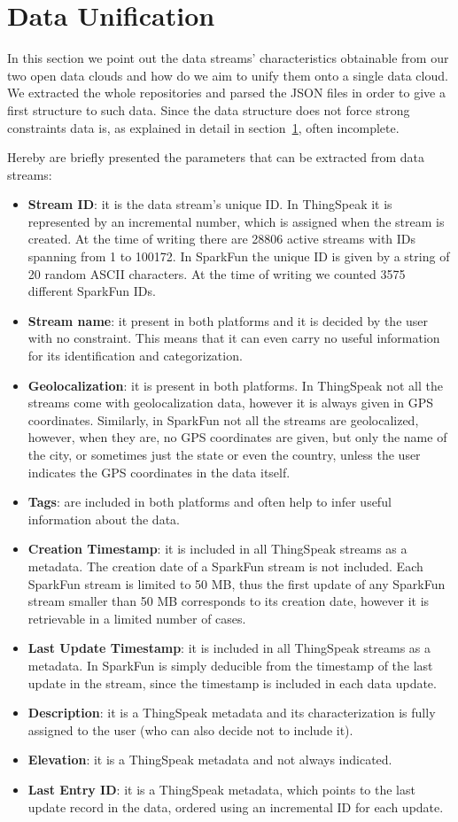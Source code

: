 \section{Data Unification}
\label{sec:unification}
In this section we point out the data streams' characteristics obtainable from our two open data clouds and how do we aim to unify them onto a single data cloud.
We extracted the whole repositories and parsed the JSON files in order to give a first structure to such data.
Since the data structure does not force strong constraints data is, as explained in detail in section~\ref{sec:unification}, often incomplete.

Hereby are briefly presented the parameters that can be extracted from data streams:
\begin{itemize}
 \item \textbf{Stream ID}: it is the data stream's unique ID. In ThingSpeak it is represented by an incremental number, which is assigned when the stream is created. At the time of writing there are 28806 active streams with IDs spanning from 1 to 100172. In SparkFun the unique ID is given by a string of 20 random ASCII characters. At the time of writing we counted 3575 different SparkFun IDs. 
 \item \textbf{Stream name}: it present in both platforms and it is decided by the user with no constraint. This means that it can even carry no useful information for its identification and categorization.
 \item \textbf{Geolocalization}: it is present in both platforms. In ThingSpeak not all the streams come with geolocalization data, however it is always given in GPS coordinates. Similarly, in SparkFun not all the streams are geolocalized, however, when they are, no GPS coordinates are given, but only the name of the city, or sometimes just the state or even the country, unless the user indicates the GPS coordinates in the data itself.
 \item \textbf{Tags}: are included in both platforms and often help to infer useful information about the data.
 \item \textbf{Creation Timestamp}: it is included in all ThingSpeak streams as a metadata. The creation date of a SparkFun stream is not included. Each SparkFun stream is limited to 50 MB, thus the first update of any SparkFun stream smaller than 50 MB corresponds to its creation date,  however it is retrievable in a limited number of cases.
 \item \textbf{Last Update Timestamp}: it is included in all ThingSpeak streams as a metadata. In SparkFun is simply deducible from the timestamp of the last update in the stream, since the timestamp is included in each data update.
 \item \textbf{Description}: it is a ThingSpeak metadata and its characterization is fully assigned to the user (who can also decide not to include it).
 \item \textbf{Elevation}: it is a ThingSpeak metadata and not always indicated.
 \item \textbf{Last Entry ID}: it is a ThingSpeak metadata, which points to the last update record in the data, ordered using an incremental ID for each update.
\end{itemize}

